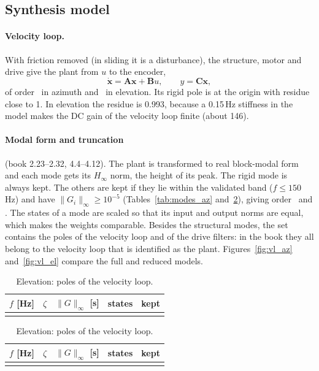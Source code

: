 \documentclass[10pt,a4paper]{article}
\numberwithin{equation}{section}
\begin{document}
\subsection{Synthesis model}
\paragraph{Velocity loop.} With friction removed (in sliding it is a disturbance), the structure, motor and drive give the plant from $u$ to the encoder,
\begin{equation}
\dot{\mathbf x}=\mathbf A\mathbf x+\mathbf Bu,\qquad y=\mathbf C\mathbf x ,
\end{equation}
of order \nFullA\ in azimuth and \nFullP\ in elevation. Its rigid pole is at the origin with residue close to 1. In elevation the residue is 0.993, because a 0.15\,Hz stiffness in the model makes the DC gain of the velocity loop finite (about 146).

\paragraph{Modal form and truncation} (book 2.23--2.32, 4.4--4.12). The plant is transformed to real block-modal form and each mode gets its $H_\infty$ norm, the height of its peak. The rigid mode is always kept. The others are kept if they lie within the validated band ($f\leq150$\,Hz) and have $\|G_i\|_\infty\geq10^{-5}$ (Tables~\ref{tab:modes_az} and~\ref{tab:modes_el}), giving order \nRedA\ and \nRedP. The states of a mode are scaled so that its input and output norms are equal, which makes the weights comparable. Besides the structural modes, the set contains the poles of the velocity loop and of the drive filters: in the book they all belong to the velocity loop that is identified as the plant. Figures~\ref{fig:vl_az} and~\ref{fig:vl_el} compare the full and reduced models.

\begin{table}[H]\centering\footnotesize
\begin{minipage}{0.48\linewidth}\centering
\caption{Azimuth: poles of the velocity loop.}\label{tab:modes_az}
\begin{tabular}{rrrrl}\toprule
$f$ [Hz] & $\zeta$ & $\|G\|_\infty$ [s] & states & kept \\ \midrule
\\ \bottomrule
\end{tabular}
\end{minipage}\hfill
\begin{minipage}{0.48\linewidth}\centering
\caption{Elevation: poles of the velocity loop.}\label{tab:modes_el}
\begin{tabular}{rrrrl}\toprule
$f$ [Hz] & $\zeta$ & $\|G\|_\infty$ [s] & states & kept \\ \midrule
\\ \bottomrule
\end{tabular}
\end{minipage}
\end{table}
\end{document}
